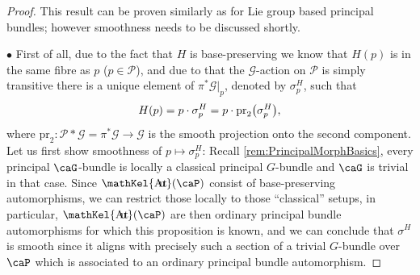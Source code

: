 \documentclass[reqno,a4paper,oneside]{amsart}
\theoremstyle{plain}
\theoremstyle{remark}
\theoremstyle{definition}
\DeclareMathOperator{\sAut}{\mathKel{A\mkern-5.5mu u\mkern-4mu t\mkern-1.5mu}}
\begin{document}
\begin{proof}
\leavevmode\newline
This result can be proven similarly as for Lie group based principal bundles; however smoothness needs to be discussed shortly. 

$\bullet$ First of all, due to the fact that $H$ is base-preserving we know that $H(p)$ is in the same fibre as $p$ ($p \in \mathcal{P}$), and due to that the $\mathcal{G}$-action on $\mathcal{P}$ is simply transitive there is a unique element of $\pi^*\mathcal{G}|_p$, denoted by $\sigma^H_p$, such that
\begin{equation*}
H(p)
=
p \cdot \sigma_p^H
=
p \cdot \mathrm{pr}_2\mleft(\sigma_p^H\mright),
\end{equation*}
where $\mathrm{pr}_2\colon \mathcal{P}*\mathcal{G} = \pi^*\mathcal{G} \to \mathcal{G}$ is the smooth projection onto the second component.
Let us first show smoothness of $p \mapsto \sigma_p^H$: Recall \ref{rem:PrincipalMorphBasics}, every principal $\caG$-bundle is locally a classical principal $G$-bundle and $\caG$ is trivial in that case. Since $\sAut(\caP)$ consist of base-preserving automorphisms, we can restrict those locally to those ``classical'' setups, in particular, $\sAut(\caP)$ are then ordinary principal bundle automorphisms for which this proposition is known, and we can conclude that $\sigma^H$ is smooth since it aligns with precisely such a section of a trivial $G$-bundle over $\caP$ which is associated to an ordinary principal bundle automorphism.
%
%

\end{proof}
\end{document}
